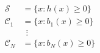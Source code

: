 \documentclass[preview]{standalone}
\begin{document}
\begin{align*}
\mathcal{S} &= \{ x : h(x) \geq 0 \}\\ \mathcal{C}_1 &= \{ x : b_1(x) \geq 0 \}\\ & \ \ \vdots\\  \mathcal{C}_N &= \{ x : b_N(x) \geq 0 \}
\end{align*}
\end{document}
